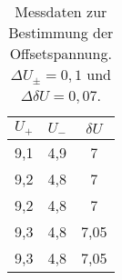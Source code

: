 \begin{table}[h]
    \centering
    \caption{Messdaten zur Bestimmung der Offsetspannung. $\Delta U_\pm=0,1$ und $\Delta \delta U=0,07$.}
    \label{tab:offsetspannung}
    \begin{tabular}{c c c}
      \toprule
      $U_+$ & $U_-$ & $\delta U$\\
      \midrule
      9,1&4,9&7\\
      9,2&4,8&7\\
      9,2&4,8&7\\
      9,3&4,8&7,05\\
      9,3&4,8&7,05\\
      \bottomrule
    \end{tabular}
  \end{table}
